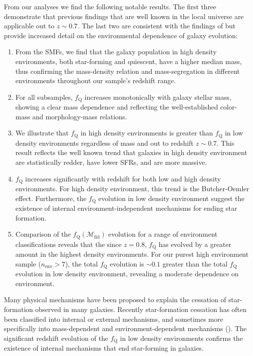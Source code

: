 \documentclass{emulateapj}
\begin{document}
From our analyses we find the following notable results. The first
three demonstrate that previous findings that are well known in the
local universe are applicable out to $z\sim 0.7$. The last two are
consistent with the findings of \cite{Peng:2010aa} but provide increased
detail on the environmental dependence of galaxy evolution:
\begin{enumerate}
	\item From the SMFs, we find that the galaxy population in high
    density environments, both star-forming and quiescent, have a
    higher median mass, thus confirming the mass-density relation and
    mass-segregation in different environments throughout our sample's
    redshift range.
	\item For all subsamples, $f_{\mathrm{Q}}$ increases monotonically with
    galaxy stellar mass, showing a clear mass dependence and
    reflecting the well-established color-mass and morphology-mass
    relations.
	\item We illustrate that $f_{\mathrm{Q}}$ in high density environments
    is greater than $f_{\mathrm{Q}}$ in low density environments
    regardless of mass and out to redshift $z\sim 0.7$. This result
    reflects the well known trend that galaxies in high density
    environment are statistically redder, have lower SFRs, and are
    more massive.
	\item $f_{\mathrm{Q}}$ increases significantly with redshift for both
    low and high density environments. For high density environment,
    this trend is the Butcher-Oemler effect. Furthermore, the
    $f_{\mathrm{Q}}$ evolution in low density environment suggest the
    existence of internal environment-independent mechanisms for
    ending star formation.
	\item Comparison of the $f_{\mathrm{Q}}(\mathcal{M}_{\mathrm{fid}})$
    evolution for a range of environment classifications reveals that
    the since $z = 0.8$, $f_{\mathrm{Q}}$ has evolved by a greater amount
    in the highest density environments. For our purest high
    environment sample ($n_{\mathrm{env}} > 7$), the total $f_{\mathrm{Q}}$
    evolution is $\sim 0.1$ greater than the total $f_{\mathrm{Q}}$
    evolution in low density environment, revealing a moderate
    dependence on environment.
\end{enumerate}

Many physical mechanisms have been proposed to explain the cessation
of star-formation observed in many galaxies. Recently star-formation
cessation has often been classified into internal or external
mechanisms, and sometimes more specifically into mass-dependent and
environment-dependent mechanisms (\citealt{Baldry:2006aa,
  Peng:2010aa}). The significant redshift evolution of the
$f_{\mathrm{Q}}$ in low density environments confirms the existence of
internal mechanisms that end star-forming in galaxies.
\end{document}
